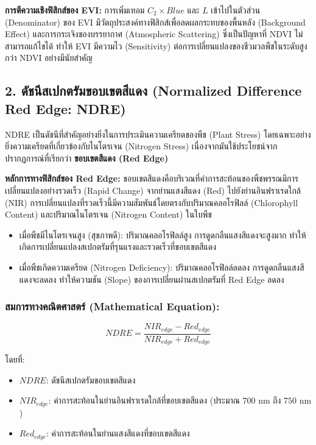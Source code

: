 \documentclass[11pt,a4paper,openany]{report}
\begin{document}
\textbf{การตีความเชิงฟิสิกส์ของ EVI:}
การเพิ่มเทอม $C_2 \times Blue$ และ $L$ เข้าไปในตัวส่วน (Denominator) ของ EVI มีวัตถุประสงค์ทางฟิสิกส์เพื่อลดผลกระทบของพื้นหลัง (Background Effect) และการกระเจิงของบรรยากาศ (Atmospheric Scattering) ซึ่งเป็นปัญหาที่ NDVI ไม่สามารถแก้ไขได้ ทำให้ EVI มีความไว (Sensitivity) ต่อการเปลี่ยนแปลงของชีวมวลพืชในระดับสูงกว่า NDVI อย่างมีนัยสำคัญ

\subsection{2. ดัชนีสเปกตรัมขอบเขตสีแดง (Normalized Difference Red Edge: NDRE)}


NDRE เป็นดัชนีที่สำคัญอย่างยิ่งในการประเมินความเครียดของพืช (Plant Stress) โดยเฉพาะอย่างยิ่งความเครียดที่เกี่ยวข้องกับไนโตรเจน (Nitrogen Stress) เนื่องจากมันใช้ประโยชน์จากปรากฏการณ์ที่เรียกว่า \textbf{ขอบเขตสีแดง (Red Edge)}

\textbf{หลักการทางฟิสิกส์ของ Red Edge:}
ขอบเขตสีแดงคือบริเวณที่ค่าการสะท้อนของพืชพรรณมีการเปลี่ยนแปลงอย่างรวดเร็ว (Rapid Change) จากย่านแสงสีแดง (Red) ไปยังย่านอินฟราเรดใกล้ (NIR) การเปลี่ยนแปลงที่รวดเร็วนี้มีความสัมพันธ์โดยตรงกับปริมาณคลอโรฟิลล์ (Chlorophyll Content) และปริมาณไนโตรเจน (Nitrogen Content) ในใบพืช

\begin{itemize}
  \item เมื่อพืชมีไนโตรเจนสูง (สุขภาพดี): ปริมาณคลอโรฟิลล์สูง การดูดกลืนแสงสีแดงจะสูงมาก ทำให้เกิดการเปลี่ยนแปลงสเปกตรัมที่รุนแรงและรวดเร็วที่ขอบเขตสีแดง
  \item เมื่อพืชเกิดความเครียด (Nitrogen Deficiency): ปริมาณคลอโรฟิลล์ลดลง การดูดกลืนแสงสีแดงจะลดลง ทำให้ความชัน (Slope) ของการเปลี่ยนผ่านสเปกตรัมที่ Red Edge ลดลง
\end{itemize}


\subsubsection{สมการทางคณิตศาสตร์ (Mathematical Equation):}


$$NDRE = \frac{NIR_{edge} - Red_{edge}}{NIR_{edge} + Red_{edge}}$$


โดยที่:
\begin{itemize}
  \item $NDRE$: ดัชนีสเปกตรัมขอบเขตสีแดง
  \item $NIR_{edge}$: ค่าการสะท้อนในย่านอินฟราเรดใกล้ที่ขอบเขตสีแดง (ประมาณ $700 \text{ nm}$ ถึง $750 \text{ nm}$)
  \item $Red_{edge}$: ค่าการสะท้อนในย่านแสงสีแดงที่ขอบเขตสีแดง
\end{itemize}
\end{document}
